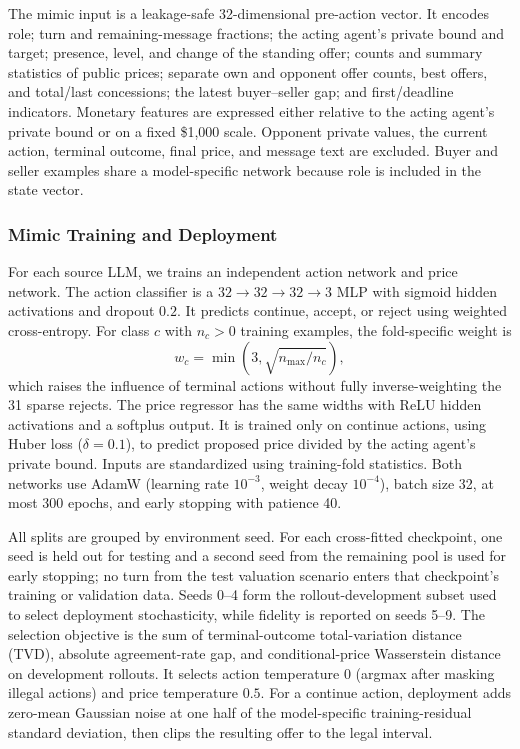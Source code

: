 \documentclass[conference]{IEEEtran}
\begin{document}
The mimic input is a leakage-safe 32-dimensional pre-action vector. It encodes role; turn and remaining-message fractions; the acting agent's private bound and target; presence, level, and change of the standing offer; counts and summary statistics of public prices; separate own and opponent offer counts, best offers, and total/last concessions; the latest buyer--seller gap; and first/deadline indicators. Monetary features are expressed either relative to the acting agent's private bound or on a fixed \$1{,}000 scale. Opponent private values, the current action, terminal outcome, final price, and message text are excluded. Buyer and seller examples share a model-specific network because role is included in the state vector.

\subsubsection{Mimic Training and Deployment}

For each source LLM, we trains an independent action network and price network. The action classifier is a $32\!\to\!32\!\to\!32\!\to\!3$ MLP with sigmoid hidden activations and dropout $0.2$. It predicts continue, accept, or reject using weighted cross-entropy. For class $c$ with $n_c>0$ training examples, the fold-specific weight is
\begin{equation}
w_c=\min\!\left(3,\sqrt{n_{\max}/n_c}\right),
\end{equation}
which raises the influence of terminal actions without fully inverse-weighting the 31 sparse rejects. The price regressor has the same widths with ReLU hidden activations and a softplus output. It is trained only on continue actions, using Huber loss ($\delta=0.1$), to predict proposed price divided by the acting agent's private bound. Inputs are standardized using training-fold statistics. Both networks use AdamW (learning rate $10^{-3}$, weight decay $10^{-4}$), batch size 32, at most 300 epochs, and early stopping with patience 40.

All splits are grouped by environment seed. For each cross-fitted checkpoint, one seed is held out for testing and a second seed from the remaining pool is used for early stopping; no turn from the test valuation scenario enters that checkpoint's training or validation data. Seeds 0--4 form the rollout-development subset used to select deployment stochasticity, while fidelity is reported on seeds 5--9. The selection objective is the sum of terminal-outcome total-variation distance (TVD), absolute agreement-rate gap, and conditional-price Wasserstein distance on development rollouts. It selects action temperature $0$ (argmax after masking illegal actions) and price temperature $0.5$. For a continue action, deployment adds zero-mean Gaussian noise at one half of the model-specific training-residual standard deviation, then clips the resulting offer to the legal interval.
\end{document}
